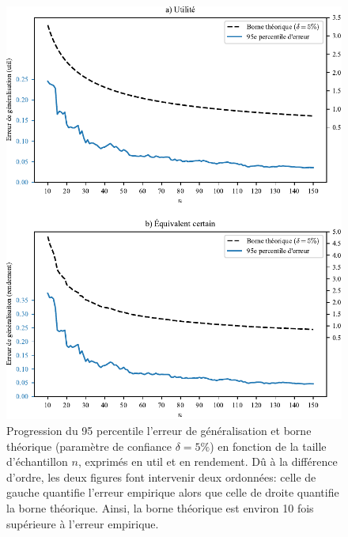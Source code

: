 \begin{figure}[h!]
  \centering
  \includegraphics[width=\textwidth]{../experiments/fig/bound_errgen.pdf}
  \caption[Erreur de généralisation en fonction de $n$]{Progression du 95\ieme
    percentile l'erreur de généralisation et borne théorique (paramètre de confiance
    $\delta = 5\%$) en fonction de la taille d'échantillon $n$, exprimés en util et en
    rendement. Dû à la différence d'ordre, les deux figures font intervenir deux
    ordonnées: celle de gauche quantifie l'erreur empirique alors que celle de droite
    quantifie la borne théorique. Ainsi, la borne théorique est environ 10 fois supérieure
    à l'erreur empirique.}
  \label{fig_bound_errgen}
\end{figure}

